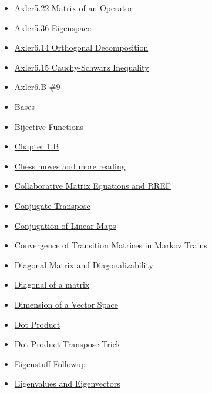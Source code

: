 \documentclass[11pt]{article}
\begin{document}
\begin{itemize}
\begin{itemize}
\begin{itemize}
\item \href{mathematics/linear\_algebra/KBrefMatrixOfAnOperator.org}{Axler5.22 Matrix of an Operator}
\item \href{mathematics/linear\_algebra/KBrefEigenspace.org}{Axler5.36 Eigenspace}
\item \href{mathematics/linear\_algebra/KBrefOrthogonalDecomposition.org}{Axler6.14 Orthogonal Decomposition}
\item \href{mathematics/linear\_algebra/KBrefCauchySchwarzInequality.org}{Axler6.15 Cauchy-Schwarz Inequality}
\item \href{mathematics/linear\_algebra/KBe21math530retAxler6B9.org}{Axler6.B \#9}
\item \href{mathematics/linear\_algebra/KBeRefLinAlgBases.org}{Bases}
\item \href{mathematics/linear\_algebra/KBrefBijectiveFunction.org}{Bijective Functions}
\item \href{mathematics/linear\_algebra/KBxChapter1B.org}{Chapter 1.B}
\item \href{mathematics/linear\_algebra/KBxChessMovesandMoreReading.org}{Chess moves and more reading}
\item \href{mathematics/linear\_algebra/KBe20math530retCollaborativeMatrixEquationsRREF.org}{Collaborative Matrix Equations and RREF}
\item \href{mathematics/linear\_algebra/KBrefConjugateTranspose.org}{Conjugate Transpose}
\item \href{mathematics/linear\_algebra/KBrefLinearMapConjugation.org}{Conjugation of Linear Maps}
\item \href{mathematics/linear\_algebra/ConvergenceOfMarkovTransitionMatrices.org}{Convergence of Transition Matrices in Markov Trains}
\item \href{mathematics/linear\_algebra/KBrefDiagonalMatrix.org}{Diagonal Matrix and Diagonalizability}
\item \href{mathematics/linear\_algebra/KBrefDiagonalOfAMatrix.org}{Diagonal of a matrix}
\item \href{mathematics/linear\_algebra/KBrefDimension.org}{Dimension of a Vector Space}
\item \href{mathematics/linear\_algebra/KBrefDotProduct.org}{Dot Product}
\item \href{mathematics/linear\_algebra/KBrefDotProductTranspose.org}{Dot Product Transpose Trick}
\item \href{mathematics/linear\_algebra/KBe21math530retEigenstuffFollowup.org}{Eigenstuff Followup}
\item \href{mathematics/linear\_algebra/KBrefEigenvaluesAndEigenVectors.org}{Eigenvalues and Eigenvectors}

\end{itemize}
\end{itemize}
\end{itemize}
\end{document}
